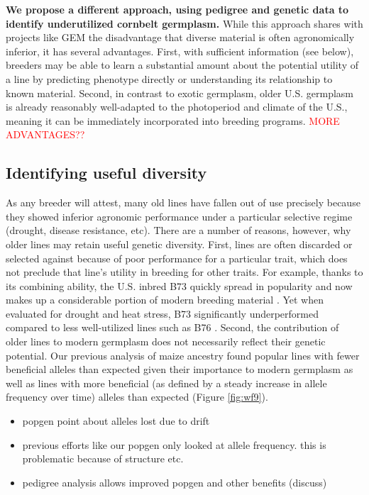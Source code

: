 \documentclass[draft,12pt]{article}
\begin{document}
\textbf{We propose a different approach, using pedigree and genetic data to identify underutilized cornbelt germplasm.}  
While this approach shares with projects like GEM the disadvantage that diverse material is often  agronomically inferior, it has several advantages.  
First, with sufficient information (see below), breeders may be able to learn a substantial amount about the potential utility of a line by predicting phenotype directly or understanding its relationship to known material. 
Second, in contrast to exotic germplasm, older U.S. germplasm is already reasonably well-adapted to the photoperiod and climate of the U.S., meaning it can be immediately incorporated into breeding programs.
\textcolor{red}{MORE ADVANTAGES??}



\subsection*{Identifying useful diversity}
As any breeder will attest, many old lines have fallen out of use precisely because they showed inferior agronomic performance under a particular selective regime (drought, disease resistance, etc).
There are a number of reasons, however, why older lines may retain useful genetic diversity.
First, lines are often discarded or selected against because of poor performance for a particular trait, which does not preclude that line's utility in breeding for other traits.
For example, thanks to its combining ability, the U.S. inbred B73 quickly spread in popularity and now makes up a considerable portion of modern breeding material \citep{van2012historical}. 
Yet when evaluated for drought and heat stress, B73 significantly underperformed compared to less well-utilized lines such as B76 \citep{chen2012characterization}.
Second, the contribution of older lines to modern germplasm does not necessarily reflect their genetic potential.
Our previous analysis of maize ancestry found popular lines with fewer beneficial alleles than expected given their importance to modern germplasm as well as lines with more beneficial (as defined by a steady increase in allele frequency over time) alleles than expected (Figure \ref{fig:wf9}).

\begin{itemize}
\item popgen point about alleles lost due to drift
\item previous efforts like our popgen only looked at allele frequency. this is problematic because of structure etc.
\item pedigree analysis allows improved popgen and other benefits (discuss)
\end{itemize}
\end{document}
